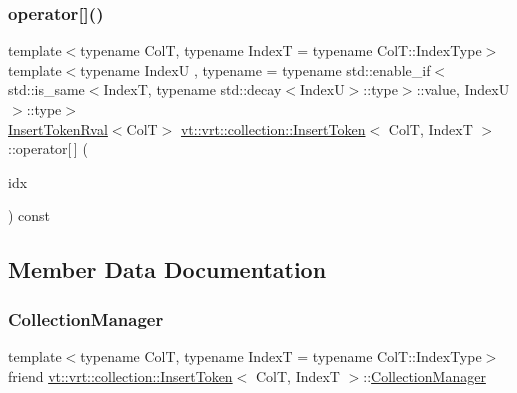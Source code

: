 \mbox{\label{structvt_1_1vrt_1_1collection_1_1_insert_token_ad0f93ec8c0d9cbf770c07c3129153b92}} 
\subsubsection{\texorpdfstring{operator[]()}{operator[]()}\hspace{0.1cm}{\footnotesize\ttfamily [2/2]}}
{\footnotesize\ttfamily template$<$typename ColT, typename IndexT = typename Col\+T\+::\+Index\+Type$>$ \\
template$<$typename IndexU , typename  = typename std\+::enable\+\_\+if$<$      std\+::is\+\_\+same$<$\+Index\+T, typename std\+::decay$<$\+Index\+U$>$\+::type$>$\+::value, Index\+U    $>$\+::type$>$ \\
\hyperlink{structvt_1_1vrt_1_1collection_1_1_insert_token_rval}{Insert\+Token\+Rval}$<$ColT$>$ \hyperlink{structvt_1_1vrt_1_1collection_1_1_insert_token}{vt\+::vrt\+::collection\+::\+Insert\+Token}$<$ ColT, IndexT $>$\+::operator\mbox{[}$\,$\mbox{]} (\begin{DoxyParamCaption}\item[{IndexU const \&}]{idx }\end{DoxyParamCaption}) const\hspace{0.3cm}{\ttfamily [inline]}}



\subsection{Member Data Documentation}
\mbox{\label{structvt_1_1vrt_1_1collection_1_1_insert_token_a42b6dc06fe8e840dd6ad6c9254b937c3}} 
\subsubsection{\texorpdfstring{Collection\+Manager}{CollectionManager}}
{\footnotesize\ttfamily template$<$typename ColT, typename IndexT = typename Col\+T\+::\+Index\+Type$>$ \\
friend \hyperlink{structvt_1_1vrt_1_1collection_1_1_insert_token}{vt\+::vrt\+::collection\+::\+Insert\+Token}$<$ ColT, IndexT $>$\+::\hyperlink{structvt_1_1vrt_1_1collection_1_1_collection_manager}{Collection\+Manager}}

